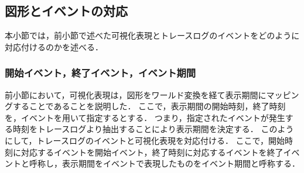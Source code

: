 \subsection{図形とイベントの対応}

本小節では，前小節で述べた可視化表現とトレースログのイベントをどのように対応付けるのかを述べる．

\subsubsection{開始イベント，終了イベント，イベント期間}
前小節において，可視化表現は，図形をワールド変換を経て表示期間にマッピングすることであることを説明した．
ここで，表示期間の開始時刻，終了時刻を，イベントを用いて指定するとする．
つまり，指定されたイベントが発生する時刻をトレースログより抽出することにより表示期間を決定する．
このようにして，トレースログのイベントと可視化表現を対応付ける．
ここで，開始時刻に対応するイベントを開始イベント，終了時刻に対応するイベントを終了イベントと呼称し，表示期間をイベントで表現したものをイベント期間と呼称する．

